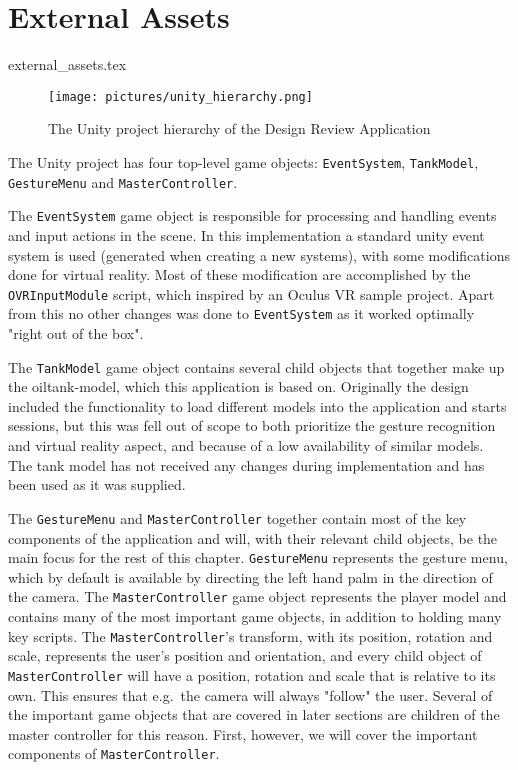 
\section{External Assets}
\label{sec:external_assets}
{external_assets.tex}

\begin{figure}%
	\texttt{[image: pictures/unity\_hierarchy.png]} %
	\caption[The Unity project hierarchy of the Design Review Application]{The Unity project hierarchy of the Design Review Application}
	\label{fig:unity_hierarchy}
\end{figure} 

The Unity project has four top-level game objects: \texttt{EventSystem}, \texttt{TankModel}, \texttt{GestureMenu} and \texttt{MasterController}. 

The \texttt{EventSystem} game object is responsible for processing and handling events and input actions in the scene. 
In this implementation a standard unity event system is used (generated when creating a new systems), with some modifications done for virtual reality.
Most of these modification are accomplished by the \texttt{OVRInputModule} script, which inspired by an Oculus VR sample project. 
Apart from this no other changes was done to \texttt{EventSystem} as it worked optimally "right out of the box".

The \texttt{TankModel} game object contains several child objects that together make up the oiltank-model, which this application is based on.
Originally the design included the functionality to load different models into the application and starts sessions, but 
this was fell out of scope to both prioritize the gesture recognition and virtual reality aspect, and because of a low availability of similar models.
The tank model has not received any changes during implementation and has been used as it was supplied. 

The \texttt{GestureMenu} and \texttt{MasterController} together contain most of the key components of the application and will, with their relevant child objects,
be the main focus for the rest of this chapter. \texttt{GestureMenu} represents the gesture menu, which by default is available by directing the left hand palm in the 
direction of the camera. The \texttt{MasterController} game object represents the player model and contains many of the most important game objects, in addition to
holding many key scripts. The \texttt{MasterController}'s transform, with its position, rotation and scale, represents the user's position and orientation, 
and every child object of \texttt{MasterController} will have a position, rotation and scale that is relative to its own. This ensures
that e.g.~the camera will always "follow" the user. Several of the important game objects that are covered in later sections are children of 
the master controller for this reason. First, however, we will cover the important components of \texttt{MasterController}.

